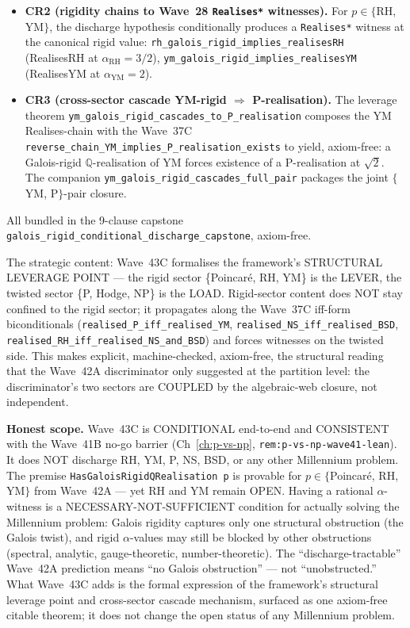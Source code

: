 \begin{remark}
\begin{itemize}
\begin{itemize}
    \item \textbf{CR2 (rigidity chains to Wave~28 \texttt{Realises*} witnesses).} For $p \in \{$RH, YM$\}$, the discharge hypothesis conditionally produces a \texttt{Realises*} witness at the canonical rigid value: \texttt{rh\_galois\_rigid\_implies\_realisesRH} (RealisesRH at $\alpha_{\mathrm{RH}} = 3/2$), \texttt{ym\_galois\_rigid\_implies\_realisesYM} (RealisesYM at $\alpha_{\mathrm{YM}} = 2$).
    \item \textbf{CR3 (cross-sector cascade YM-rigid $\Rightarrow$ P-realisation).} The leverage theorem \texttt{ym\_galois\_rigid\_cascades\_to\_P\_realisation} composes the YM Realises-chain with the Wave~37C \texttt{reverse\_chain\_YM\_implies\_P\_realisation\_exists} to yield, axiom-free: a Galois-rigid $\mathbb{Q}$-realisation of YM forces existence of a P-realisation at $\sqrt{2}$. The companion \texttt{ym\_galois\_rigid\_cascades\_full\_pair} packages the joint $\{$YM, P$\}$-pair closure.
  \end{itemize}
  All bundled in the 9-clause capstone \texttt{galois\_rigid\_conditional\_discharge\_capstone}, axiom-free.
\end{itemize}
The strategic content: Wave~43C formalises the framework's STRUCTURAL LEVERAGE POINT --- the rigid sector \{Poincar\'e, RH, YM\} is the LEVER, the twisted sector \{P, Hodge, NP\} is the LOAD. Rigid-sector content does NOT stay confined to the rigid sector; it propagates along the Wave~37C iff-form biconditionals (\texttt{realised\_P\_iff\_realised\_YM}, \texttt{realised\_NS\_iff\_realised\_BSD}, \texttt{realised\_RH\_iff\_realised\_NS\_and\_BSD}) and forces witnesses on the twisted side. This makes explicit, machine-checked, axiom-free, the structural reading that the Wave~42A discriminator only suggested at the partition level: the discriminator's two sectors are COUPLED by the algebraic-web closure, not independent.

\textbf{Honest scope.} Wave~43C is CONDITIONAL end-to-end and CONSISTENT with the Wave~41B no-go barrier (Ch~\ref{ch:p-vs-np}, \texttt{rem:p-vs-np-wave41-lean}). It does NOT discharge RH, YM, P, NS, BSD, or any other Millennium problem. The premise \texttt{HasGaloisRigidQRealisation p} is provable for $p \in \{$Poincar\'e, RH, YM$\}$ from Wave~42A --- yet RH and YM remain OPEN. Having a rational $\alpha$-witness is a NECESSARY-NOT-SUFFICIENT condition for actually solving the Millennium problem: Galois rigidity captures only one structural obstruction (the Galois twist), and rigid $\alpha$-values may still be blocked by other obstructions (spectral, analytic, gauge-theoretic, number-theoretic). The ``discharge-tractable'' Wave~42A prediction means ``no Galois obstruction'' --- not ``unobstructed.'' What Wave~43C adds is the formal expression of the framework's structural leverage point and cross-sector cascade mechanism, surfaced as one axiom-free citable theorem; it does not change the open status of any Millennium problem.
\end{remark}


